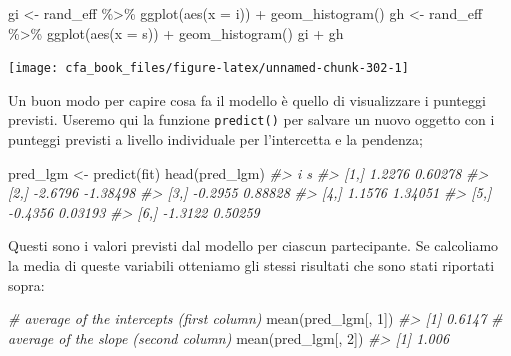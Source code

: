 \documentclass[
  11pt,
]{krantz}
\makeatletter
\newenvironment{Shaded}{\begin{snugshade}}{\end{snugshade}}
\newcommand{\AttributeTok}[1]{\textcolor[rgb]{0.61,0.61,0.61}{#1}}
\newcommand{\CommentTok}[1]{\textcolor[rgb]{0.37,0.37,0.37}{\textit{#1}}}
\newcommand{\DecValTok}[1]{\textcolor[rgb]{0.06,0.06,0.06}{#1}}
\newcommand{\FunctionTok}[1]{\textcolor[rgb]{0,0,0}{#1}}
\newcommand{\NormalTok}[1]{#1}
\newcommand{\OtherTok}[1]{\textcolor[rgb]{0.37,0.37,0.37}{#1}}
\newcommand{\SpecialCharTok}[1]{\textcolor[rgb]{0,0,0}{#1}}
\newenvironment{kframe}{%
\medskip{}
\setlength{\fboxsep}{.8em}
 \def\at@end@of@kframe{}%
 \ifinner\ifhmode%
  \def\at@end@of@kframe{\end{minipage}}%
  \begin{minipage}{\columnwidth}%
 \fi\fi%
 \def\FrameCommand##1{\hskip\@totalleftmargin \hskip-\fboxsep
 \colorbox{shadecolor}{##1}\hskip-\fboxsep
     \hskip-\linewidth \hskip-\@totalleftmargin \hskip\columnwidth}%
 \MakeFramed {\advance\hsize-\width
   \@totalleftmargin\z@ \linewidth\hsize
   \@setminipage}}%
 {\par\unskip\endMakeFramed%
 \at@end@of@kframe}
\renewenvironment{Shaded}{\begin{kframe}}{\end{kframe}}
\theoremstyle{definition}
\theoremstyle{definition}
\theoremstyle{definition}
\theoremstyle{definition}
\theoremstyle{remark}
\makeatother
\begin{document}
\begin{Shaded}
\begin{Highlighting}[]
\NormalTok{gi }\OtherTok{\textless{}{-}}\NormalTok{ rand\_eff }\SpecialCharTok{\%\textgreater{}\%}
  \FunctionTok{ggplot}\NormalTok{(}\FunctionTok{aes}\NormalTok{(}\AttributeTok{x =}\NormalTok{ i)) }\SpecialCharTok{+}
  \FunctionTok{geom\_histogram}\NormalTok{()}
\NormalTok{gh }\OtherTok{\textless{}{-}}\NormalTok{ rand\_eff }\SpecialCharTok{\%\textgreater{}\%}
  \FunctionTok{ggplot}\NormalTok{(}\FunctionTok{aes}\NormalTok{(}\AttributeTok{x =}\NormalTok{ s)) }\SpecialCharTok{+}
  \FunctionTok{geom\_histogram}\NormalTok{()}
\NormalTok{gi }\SpecialCharTok{+}\NormalTok{ gh}
\end{Highlighting}
\end{Shaded}

\begin{center}\texttt{[image: cfa\_book\_files/figure-latex/unnamed-chunk-302-1]} \end{center}

Un buon modo per capire cosa fa il modello è quello di visualizzare i punteggi previsti. Useremo qui la funzione \texttt{predict()} per salvare un nuovo oggetto con i punteggi previsti a livello individuale per l'intercetta e la pendenza;

\begin{Shaded}
\begin{Highlighting}[]
\NormalTok{pred\_lgm }\OtherTok{\textless{}{-}} \FunctionTok{predict}\NormalTok{(fit)}
\FunctionTok{head}\NormalTok{(pred\_lgm)}
\CommentTok{\#\textgreater{}            i        s}
\CommentTok{\#\textgreater{} [1,]  1.2276  0.60278}
\CommentTok{\#\textgreater{} [2,] {-}2.6796 {-}1.38498}
\CommentTok{\#\textgreater{} [3,] {-}0.2955  0.88828}
\CommentTok{\#\textgreater{} [4,]  1.1576  1.34051}
\CommentTok{\#\textgreater{} [5,] {-}0.4356  0.03193}
\CommentTok{\#\textgreater{} [6,] {-}1.3122  0.50259}
\end{Highlighting}
\end{Shaded}

Questi sono i valori previsti dal modello per ciascun partecipante. Se calcoliamo la media di queste variabili otteniamo gli stessi risultati che sono stati riportati sopra:

\begin{Shaded}
\begin{Highlighting}[]
\CommentTok{\# average of the intercepts (first column)}
\FunctionTok{mean}\NormalTok{(pred\_lgm[, }\DecValTok{1}\NormalTok{])}
\CommentTok{\#\textgreater{} [1] 0.6147}
\CommentTok{\# average of the slope (second column)}
\FunctionTok{mean}\NormalTok{(pred\_lgm[, }\DecValTok{2}\NormalTok{])}
\CommentTok{\#\textgreater{} [1] 1.006}
\end{Highlighting}
\end{Shaded}
\end{document}
